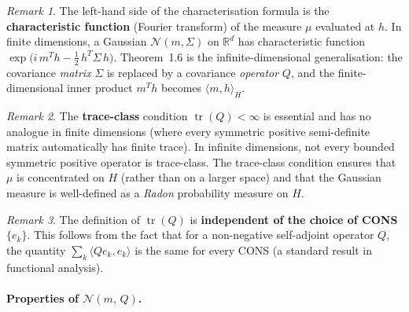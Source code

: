\documentclass[11pt]{article}
\theoremstyle{definition}
\theoremstyle{remark}
\newtheorem{remark}{Remark}
\DeclareMathOperator{\tr}{tr}
\begin{document}
\begin{remark}
The left-hand side of the characterisation formula is the
\textbf{characteristic function} (Fourier transform) of the measure $\mu$
evaluated at $h$.  In finite dimensions, a Gaussian
$\mathcal{N}(m, \Sigma)$ on $\mathbb{R}^d$ has characteristic function
$\exp\!\bigl(i\,m^T h - \tfrac{1}{2}\,h^T \Sigma\, h\bigr)$.
Theorem~1.6 is the infinite-dimensional generalisation: the covariance
\emph{matrix} $\Sigma$ is replaced by a covariance \emph{operator} $Q$,
and the finite-dimensional inner product $m^T h$ becomes
$\langle m, h\rangle_H$.
\end{remark}

\begin{remark}
The \textbf{trace-class} condition $\tr(Q) < \infty$ is essential and
has no analogue in finite dimensions (where every symmetric
positive semi-definite matrix automatically has finite trace).
In infinite dimensions, not every bounded symmetric positive operator
is trace-class.  The trace-class condition ensures that
$\mu$ is concentrated on $H$ (rather than on a larger space)
and that the Gaussian measure is well-defined as a \emph{Radon}
probability measure on $H$.
\end{remark}

\begin{remark}
The definition of $\tr(Q)$ is \textbf{independent of the choice of CONS}
$\{e_k\}$.  This follows from the fact that for a non-negative
self-adjoint operator $Q$, the quantity
$\sum_k \langle Q e_k, e_k\rangle$ is the same for every CONS
(a standard result in functional analysis).
\end{remark}

\paragraph{Properties of $\mathcal{N}(m,\,Q)$.}
\end{document}

